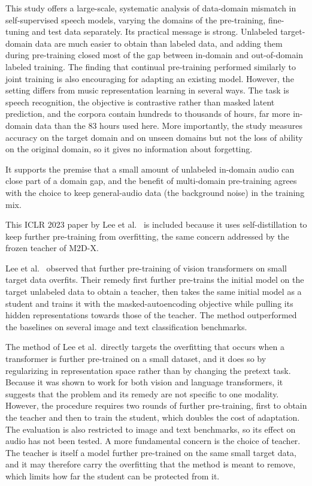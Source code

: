 \documentclass{FastFyp}
\begin{document}
\lrcritical
This study offers a large-scale, systematic analysis of data-domain mismatch in self-supervised speech models, varying the domains of the pre-training, fine-tuning and test data separately. Its practical message is strong. Unlabeled target-domain data are much easier to obtain than labeled data, and adding them during pre-training closed most of the gap between in-domain and out-of-domain labeled training. The finding that continual pre-training performed similarly to joint training is also encouraging for adapting an existing model. However, the setting differs from music representation learning in several ways. The task is speech recognition, the objective is contrastive rather than masked latent prediction, and the corpora contain hundreds to thousands of hours, far more in-domain data than the 83 hours used here. More importantly, the study measures accuracy on the target domain and on unseen domains but not the loss of ability on the original domain, so it gives no information about forgetting.

\lrrelation
It supports the premise that a small amount of unlabeled in-domain audio can close part of a domain gap, and the benefit of multi-domain pre-training agrees with the choice to keep general-audio data (the background noise) in the training mix.

This ICLR 2023 paper by Lee et al.~\cite{ref:Lee:2023selfdistill} is included because it uses self-distillation to keep further pre-training from overfitting, the same concern addressed by the frozen teacher of M2D-X.

\lrsummary
Lee et al.~\cite{ref:Lee:2023selfdistill} observed that further pre-training of vision transformers on small target data overfits. Their remedy first further pre-trains the initial model on the target unlabeled data to obtain a teacher, then takes the same initial model as a student and trains it with the masked-autoencoding objective while pulling its hidden representations towards those of the teacher. The method outperformed the baselines on several image and text classification benchmarks.

\lrcritical
The method of Lee et al.\ directly targets the overfitting that occurs when a transformer is further pre-trained on a small dataset, and it does so by regularizing in representation space rather than by changing the pretext task. Because it was shown to work for both vision and language transformers, it suggests that the problem and its remedy are not specific to one modality. However, the procedure requires two rounds of further pre-training, first to obtain the teacher and then to train the student, which doubles the cost of adaptation. The evaluation is also restricted to image and text benchmarks, so its effect on audio has not been tested. A more fundamental concern is the choice of teacher. The teacher is itself a model further pre-trained on the same small target data, and it may therefore carry the overfitting that the method is meant to remove, which limits how far the student can be protected from it.
\end{document}
